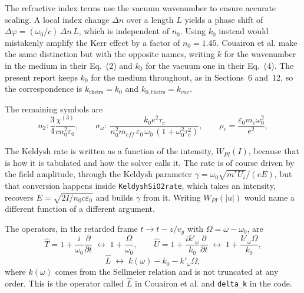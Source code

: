 The refractive index terms use the vacuum wavenumber to ensure accurate scaling. A local index change $\Delta n$ over a length $L$ yields a phase shift of $\Delta\varphi = (\omega_0/c)\,\Delta n\,L$, which is independent of $n_0$. Using $k_0$ instead would mistakenly amplify the Kerr effect by a factor of $n_0 = 1.45$. Couairon et al. make the same distinction but with the opposite names, writing $k$ for the wavenumber in the medium in their Eq.~(2) and $k_0$ for the vacuum one in their Eq.~(4). The present report keeps $k_0$ for the medium throughout, as in Sections~6 and~12, so the correspondence is $k_{\text{theirs}} = k_0$ and $k_{0,\text{theirs}} = k_{vac}$.

The remaining symbols are
\begin{equation}
n_2 : \frac{3}{4}\frac{\chi^{(3)}}{cn_0^2\varepsilon_0},
\qquad
\sigma_\omega : \ \dfrac{k_0 e^2 \tau_c}{n_0^2 m_{eff}\,\varepsilon_0\,\omega_0\,(1 + \omega_0^2\tau_c^2)} ,
\qquad
\rho_c = \frac{\varepsilon_0 m_e \omega_0^2}{e^2},
\end{equation}

The Keldysh rate is written as a function of the intensity, $W_{PI}(I)$, because that is how it is tabulated and how the solver calls it. The rate is of course driven by the field amplitude, through the Keldysh parameter $\gamma=\omega_0\sqrt{m^*U_i}/(eE)$, but that conversion happens inside \texttt{KeldyshSiO2\dotb rate}, which takes an intensity, recovers $E=\sqrt{2I/n_0c\varepsilon_0}$ and builds $\gamma$ from it. Writing $W_{PI}(|u|)$ would name a different function of a different argument.

The operators, in the retarded frame $t\to t-z/v_g$ with $\Omega=\omega-\omega_0$, are
\begin{equation}
\hat{T} = 1+\frac{i}{\omega_0}\frac{\partial}{\partial t} \;\longleftrightarrow\; 1+\frac{\Omega}{\omega_0},
\qquad
\hat{U} = 1+\frac{i k'_\omega}{k_0}\frac{\partial}{\partial t} \;\longleftrightarrow\; 1+\frac{k'_\omega\Omega}{k_0},
\end{equation}
\begin{equation}
\label{eq:Lhat}
\hat{L} \;\longleftrightarrow\; k(\omega)-k_0-k'_\omega\Omega ,
\end{equation}
where $k(\omega)$ comes from the Sellmeier relation and is not truncated at any order. This is the operator called $\hat{L}$ in Couairon et al. and \texttt{delta\_k} in the code.

